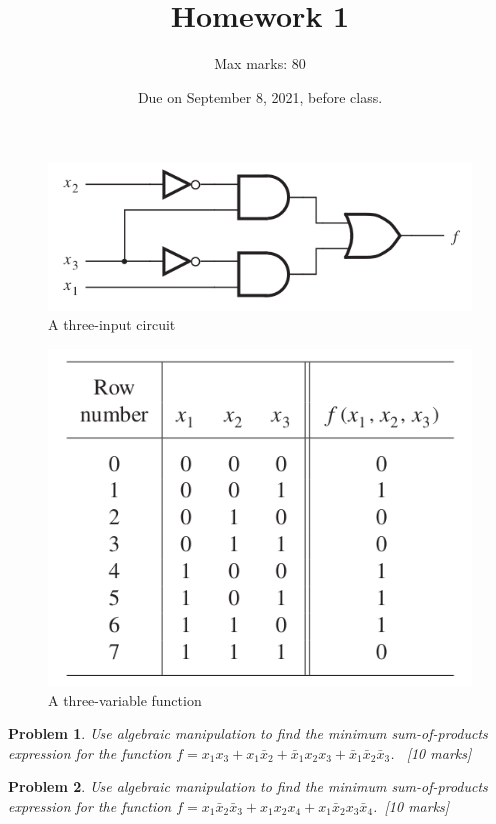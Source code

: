 \documentclass[twocolumn]{article}
\title{Homework 1}
\author{Max marks: 80}
\date{Due on September 8, 2021, before class.}
\newtheorem{prob}{Problem}
\newcommand{\bx}{\bar{x}}
\begin{document}
\maketitle

\begin{figure}
\centering
\includegraphics[width=\linewidth]{fig-2.24a.png}
\caption{A three-input circuit}
\label{fig:fig-2.24a}
\end{figure}

\begin{figure}
    \centering
    \includegraphics[width=\linewidth]{fig-2.23.png}
    \caption{A three-variable function}
    \label{fig:fig-2.23}
\end{figure}

\begin{prob}
Use algebraic manipulation to find the minimum sum-of-products expression for the function $f = x_1x_3 + x_1\bx_2 + \bx_1 x_2 x_3 + \bx_1 \bx_2 \bx_3$. ~\cite[Prob 2.12]{brown2013fundamentals}[10 marks]
\end{prob}

\begin{prob}
Use algebraic manipulation to find the minimum sum-of-products expression for the function $f = x_1\bx_2\bx_3 + x_1x_2x_4 + x_1\bx_2 x_3\bx_4$.~\cite[Prob 2.13]{brown2013fundamentals}[10 marks]
\end{prob}
\end{document}
